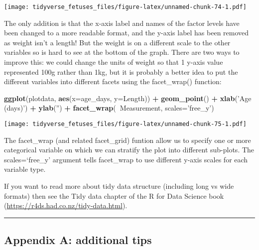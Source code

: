 \documentclass[
]{article}
\newenvironment{Shaded}{\begin{snugshade}}{\end{snugshade}}
\newcommand{\DataTypeTok}[1]{\textcolor[rgb]{0.13,0.29,0.53}{#1}}
\newcommand{\KeywordTok}[1]{\textcolor[rgb]{0.13,0.29,0.53}{\textbf{#1}}}
\newcommand{\NormalTok}[1]{#1}
\newcommand{\OperatorTok}[1]{\textcolor[rgb]{0.81,0.36,0.00}{\textbf{#1}}}
\newcommand{\StringTok}[1]{\textcolor[rgb]{0.31,0.60,0.02}{#1}}
\begin{document}
\texttt{[image: tidyverse\_fetuses\_files/figure-latex/unnamed-chunk-74-1.pdf]}

The only addition is that the x-axis label and names of the factor
levels have been changed to a more readable format, and the y-axis label
has been removed as weight isn't a length! But the weight is on a
different scale to the other variables so is hard to see at the bottom
of the graph. There are two ways to improve this: we could change the
units of weight so that 1 y-axis value represented 100g rather than 1kg,
but it is probably a better idea to put the different variables into
different facets using the facet\_wrap() function:

\begin{Shaded}
\begin{Highlighting}[]
\KeywordTok{ggplot}\NormalTok{(plotdata, }\KeywordTok{aes}\NormalTok{(}\DataTypeTok{x=}\NormalTok{age_days, }\DataTypeTok{y=}\NormalTok{Length)) }\OperatorTok{+}
\StringTok{    }\KeywordTok{geom_point}\NormalTok{() }\OperatorTok{+}
\StringTok{    }\KeywordTok{xlab}\NormalTok{(}\StringTok{'Age (days)'}\NormalTok{) }\OperatorTok{+}
\StringTok{    }\KeywordTok{ylab}\NormalTok{(}\StringTok{''}\NormalTok{) }\OperatorTok{+}
\StringTok{    }\KeywordTok{facet_wrap}\NormalTok{(}\OperatorTok{~}\NormalTok{Measurement, }\DataTypeTok{scales=}\StringTok{'free_y'}\NormalTok{) }
\end{Highlighting}
\end{Shaded}

\texttt{[image: tidyverse\_fetuses\_files/figure-latex/unnamed-chunk-75-1.pdf]}

The facet\_wrap (and related facet\_grid) funtion allow us to specify
one or more categorical variable on which we can stratify the plot into
different sub-plots. The scales=`free\_y' argument tells facet\_wrap to
use different y-axis scales for each variable type.

If you want to read more about tidy data structure (including long vs
wide formats) then see the Tidy data chapter of the R for Data Science
book (\url{https://r4ds.had.co.nz/tidy-data.html}).

\begin{center}\rule{0.5\linewidth}{0.5pt}\end{center}

\hypertarget{appendix-a-additional-tips}{%
\subsection{Appendix A: additional
tips}\label{appendix-a-additional-tips}}
\end{document}

